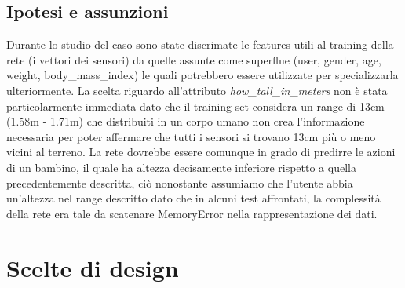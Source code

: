 \documentclass[12pt]{article}
\begin{document}
\subsection{Ipotesi e assunzioni}
Durante lo studio del caso sono state discrimate le features utili al training della rete (i vettori dei sensori) da quelle assunte come superflue (user, gender, age, weight, body\_mass\_index) le quali potrebbero essere utilizzate per specializzarla ulteriormente.\newline
La scelta riguardo all'attributo \emph{how\_tall\_in\_meters} non è stata particolarmente immediata dato che il training set considera un range di 13cm (1.58m - 1.71m) che distribuiti in un corpo umano non crea l'informazione necessaria per poter affermare che tutti i sensori si trovano 13cm più o meno vicini al terreno. La rete dovrebbe essere comunque in grado di predirre le azioni di un bambino, il quale ha altezza decisamente inferiore rispetto a quella precedentemente descritta, ciò nonostante assumiamo che l'utente abbia un'altezza nel range descritto dato che in alcuni test affrontati, la complessità della rete era tale da scatenare MemoryError nella rappresentazione dei dati.

\section{Scelte di design}
\end{document}
